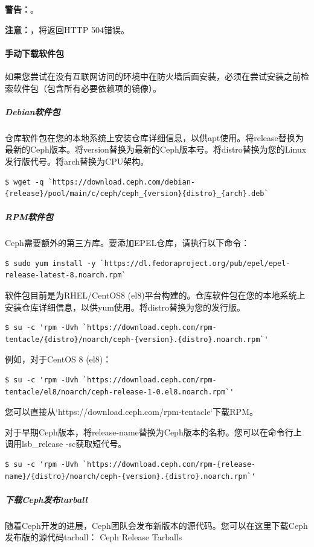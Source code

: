 \documentclass[12pt,UTF8]{ctexbook}
\begin{document}
\textbf{警告：}。

\textbf{注意：}，将返回HTTP 504错误。

\paragraph{手动下载软件包}
如果您尝试在没有互联网访问的环境中在防火墙后面安装，必须在尝试安装之前检索软件包（包含所有必要依赖项的镜像）。

\subparagraph{Debian软件包}
仓库软件包在您的本地系统上安装仓库详细信息，以供apt使用。将{release}替换为最新的Ceph版本。将{version}替换为最新的Ceph版本号。将{distro}替换为您的Linux发行版代号。将{arch}替换为CPU架构。
\begin{verbatim}
$ wget -q `https://download.ceph.com/debian-{release}/pool/main/c/ceph/ceph_{version}{distro}_{arch}.deb`
\end{verbatim}

\subparagraph{RPM软件包}
Ceph需要额外的第三方库。要添加EPEL仓库，请执行以下命令：
\begin{verbatim}
$ sudo yum install -y `https://dl.fedoraproject.org/pub/epel/epel-release-latest-8.noarch.rpm`
\end{verbatim}

软件包目前是为RHEL/CentOS8 (el8)平台构建的。仓库软件包在您的本地系统上安装仓库详细信息，以供yum使用。将{distro}替换为您的发行版。
\begin{verbatim}
$ su -c 'rpm -Uvh `https://download.ceph.com/rpm-tentacle/{distro}/noarch/ceph-{version}.{distro}.noarch.rpm`'
\end{verbatim}

例如，对于CentOS 8 (el8)：
\begin{verbatim}
$ su -c 'rpm -Uvh `https://download.ceph.com/rpm-tentacle/el8/noarch/ceph-release-1-0.el8.noarch.rpm`'
\end{verbatim}

您可以直接从`https://download.ceph.com/rpm-tentacle`下载RPM。

对于早期Ceph版本，将{release-name}替换为Ceph版本的名称。您可以在命令行上调用lsb_release -sc获取短代号。
\begin{verbatim}
$ su -c 'rpm -Uvh `https://download.ceph.com/rpm-{release-name}/{distro}/noarch/ceph-{version}.{distro}.noarch.rpm`'
\end{verbatim}

\subparagraph{下载Ceph发布tarball}
随着Ceph开发的进展，Ceph团队会发布新版本的源代码。您可以在这里下载Ceph发布版的源代码tarball：
Ceph Release Tarballs
\end{document}
